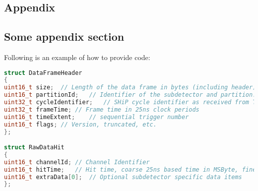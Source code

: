 \begin{appendices}
\renewcommand{\thefigure}{A.\arabic{figure}}
\renewcommand{\thetable}{A.\arabic{table}}
\chapter*{Appendix}
\label{ch:appendix}

\section*{Some appendix section}
\label{app:example}
Following is an example of how to provide code:
\begin{minipage}{\textwidth}
\begin{lstlisting}[caption={Event data format as accepted by ControlHost. The number of RawDataHits is not limited, the number of hits which are read is determined by the size parameter in the header.}, label={lst:dataformat}, language=C++]
struct DataFrameHeader
{
uint16_t size;	// Length of the data frame in bytes (including header).
uint16_t partitionId;	// Identifier of the subdetector and partition.
uint32_t cycleIdentifier;	// SHiP cycle identifier as received from TFC.
uint32_t frameTime;	// Frame time in 25ns clock periods
uint16_t timeExtent;	// sequential trigger number 
uint16_t flags;	// Version, truncated, etc.
};

struct RawDataHit
{
uint16_t channelId;	// Channel Identifier
uint16_t hitTime;	// Hit time, coarse 25ns based time in MSByte, fine time in LSByte
uint16_t extraData[0];	// Optional subdetector specific data items
};
\end{lstlisting}
\end{minipage}


\end{appendices}